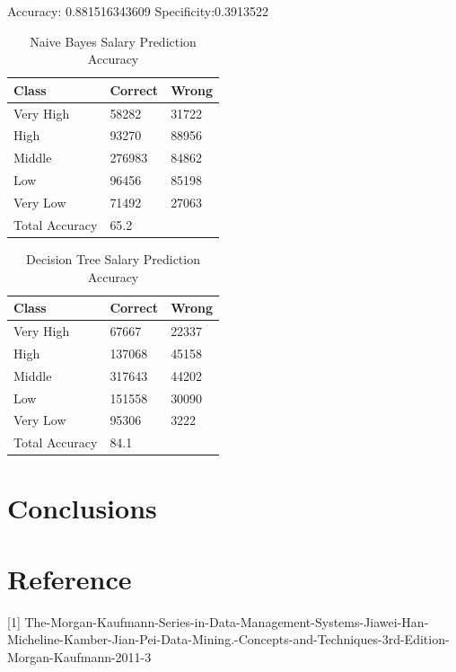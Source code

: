 \documentclass[sigconf]{acmart}
\begin{document}
Accuracy: 0.881516343609 \qquad Specificity:0.3913522

\begin{table}[h]
    \caption{Naive Bayes Salary Prediction Accuracy}
    \centering
    \begin{tabular}{l | l | l}
        Class & Correct & Wrong \\
        \hline
         Very High& 58282 &31722 \\
         High     & 93270 &88956 \\
         Middle   & 276983&84862 \\
         Low      & 96456 &85198 \\
         Very Low & 71492 &27063 \\
         \hline
         Total Accuracy & 65.2%
    \end{tabular}
    \label{tab:my_label}
\end{table}

\begin{table}[h]
    \caption{Decision Tree Salary Prediction Accuracy}
    \centering
    \begin{tabular}{l | l | l}
        Class & Correct & Wrong \\
        \hline
         Very High& 67667 &22337 \\
         High     & 137068&45158 \\
         Middle   & 317643&44202 \\
         Low      & 151558&30090 \\
         Very Low & 95306 &3222 \\
         \hline
         Total Accuracy & 84.1%
    \end{tabular}
    \label{tab:my_label}
\end{table}

\section{Conclusions}

\section*{Reference}
[1]  The-Morgan-Kaufmann-Series-in-Data-Management-Systems-Jiawei-Han-Micheline-Kamber-Jian-Pei-Data-Mining.-Concepts-and-Techniques-3rd-Edition-Morgan-Kaufmann-2011-3




\end{document}
